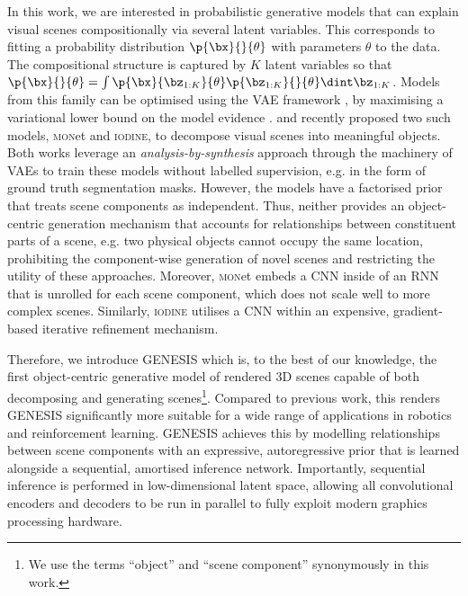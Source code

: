 \documentclass{article}
\begin{document}
In this work, we are interested in probabilistic generative models that can explain visual scenes compositionally via several latent variables.
This corresponds to fitting a probability distribution $\p{\bx}{}{\theta}$ with parameters $\theta$ to the data.
The compositional structure is captured by $K$ latent variables so that $\p{\bx}{}{\theta} = \int \p{\bx}{\bz_{1:K}}{\theta} \p{\bz_{1:K}}{}{\theta} \dint \bz_{1:K}$.
Models from this family can be optimised using the \gls{VAE} framework \citep{kingma2013auto,rezende2014stochastic}, by maximising a variational lower bound on the model evidence \citep{jordan1999introduction}.
\citet{burgess2019monet} and \citet{greff2019multi} recently proposed two such models, \textsc{mon}et and \textsc{iodine}, to decompose visual scenes into meaningful objects.
Both works leverage an \emph{analysis-by-synthesis} approach through the machinery of \glspl{VAE} \citep{kingma2013auto,rezende2014stochastic} to train these models without labelled supervision, e.g. in the form of ground truth segmentation masks.
However, the models have a factorised prior that treats scene components as independent.
Thus, neither provides an object-centric generation mechanism that accounts for relationships between constituent parts of a scene, e.g. two physical objects cannot occupy the same location, prohibiting the component-wise generation of novel scenes and restricting the utility of these approaches.
Moreover, \textsc{mon}et embeds a \gls{CNN} inside of an \gls{RNN} that is unrolled for each scene component, which does not scale well to more complex scenes.
Similarly, \textsc{iodine} utilises a \gls{CNN} within an expensive, gradient-based iterative refinement mechanism.

Therefore, we introduce \gls{GENESIS} which is, to the best of our knowledge, the first object-centric generative model of rendered 3D scenes capable of both decomposing and generating scenes\footnote{We use the terms ``object'' and ``scene component'' synonymously in this work.}.
Compared to previous work, this renders \gls{GENESIS} significantly more suitable for a wide range of applications in robotics and reinforcement learning. \gls{GENESIS} achieves this by modelling relationships between scene components with an expressive, autoregressive prior that is learned alongside a sequential, amortised inference network.
Importantly, sequential inference is performed in low-dimensional latent space, allowing all convolutional encoders and decoders to be run in parallel to fully exploit modern graphics processing hardware.
\end{document}
